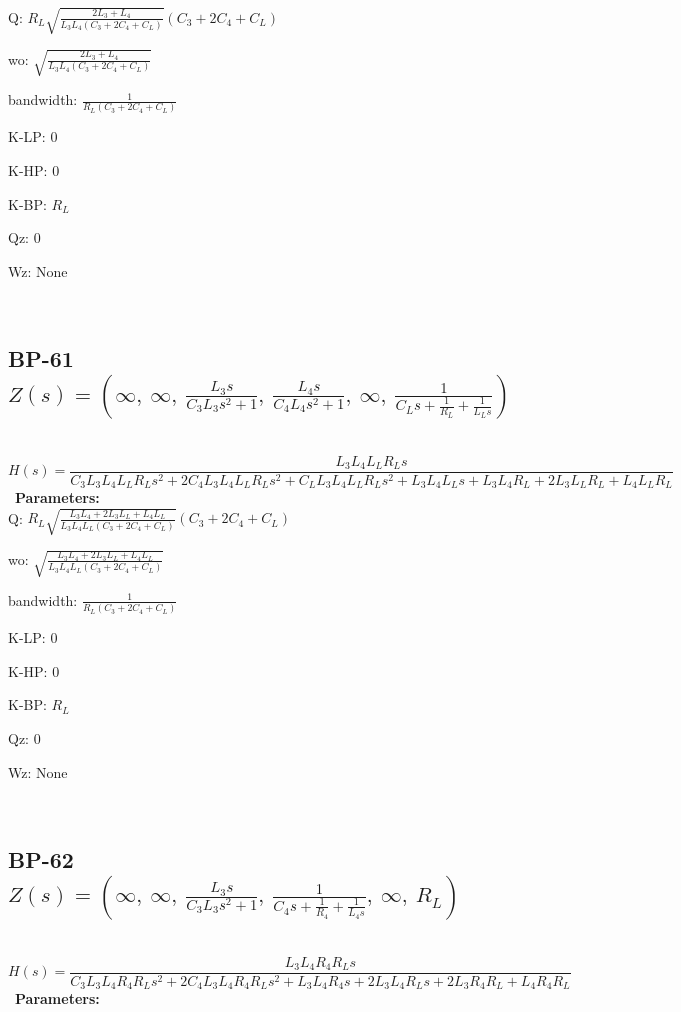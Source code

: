 \documentclass{article}
\begin{document}
Q: $R_{L} \sqrt{\frac{2 L_{3} + L_{4}}{L_{3} L_{4} \left(C_{3} + 2 C_{4} + C_{L}\right)}} \left(C_{3} + 2 C_{4} + C_{L}\right)$\ 

wo: $\sqrt{\frac{2 L_{3} + L_{4}}{L_{3} L_{4} \left(C_{3} + 2 C_{4} + C_{L}\right)}}$\ 

bandwidth: $\frac{1}{R_{L} \left(C_{3} + 2 C_{4} + C_{L}\right)}$\ 

K-LP: $0$\ 

K-HP: $0$\ 

K-BP: $R_{L}$\ 

Qz: $0$\ 

Wz: $\text{None}$\ 

\ 

\subsection{BP-61 $Z(s) = \left( \infty, \  \infty, \  \frac{L_{3} s}{C_{3} L_{3} s^{2} + 1}, \  \frac{L_{4} s}{C_{4} L_{4} s^{2} + 1}, \  \infty, \  \frac{1}{C_{L} s + \frac{1}{R_{L}} + \frac{1}{L_{L} s}}\right)$ } \ 
\textbf{\[H(s) = \frac{L_{3} L_{4} L_{L} R_{L} s}{C_{3} L_{3} L_{4} L_{L} R_{L} s^{2} + 2 C_{4} L_{3} L_{4} L_{L} R_{L} s^{2} + C_{L} L_{3} L_{4} L_{L} R_{L} s^{2} + L_{3} L_{4} L_{L} s + L_{3} L_{4} R_{L} + 2 L_{3} L_{L} R_{L} + L_{4} L_{L} R_{L}}\] } \ 
\textbf{Parameters:}\\ 

Q: $R_{L} \sqrt{\frac{L_{3} L_{4} + 2 L_{3} L_{L} + L_{4} L_{L}}{L_{3} L_{4} L_{L} \left(C_{3} + 2 C_{4} + C_{L}\right)}} \left(C_{3} + 2 C_{4} + C_{L}\right)$\ 

wo: $\sqrt{\frac{L_{3} L_{4} + 2 L_{3} L_{L} + L_{4} L_{L}}{L_{3} L_{4} L_{L} \left(C_{3} + 2 C_{4} + C_{L}\right)}}$\ 

bandwidth: $\frac{1}{R_{L} \left(C_{3} + 2 C_{4} + C_{L}\right)}$\ 

K-LP: $0$\ 

K-HP: $0$\ 

K-BP: $R_{L}$\ 

Qz: $0$\ 

Wz: $\text{None}$\ 

\ 

\subsection{BP-62 $Z(s) = \left( \infty, \  \infty, \  \frac{L_{3} s}{C_{3} L_{3} s^{2} + 1}, \  \frac{1}{C_{4} s + \frac{1}{R_{4}} + \frac{1}{L_{4} s}}, \  \infty, \  R_{L}\right)$ } \ 
\textbf{\[H(s) = \frac{L_{3} L_{4} R_{4} R_{L} s}{C_{3} L_{3} L_{4} R_{4} R_{L} s^{2} + 2 C_{4} L_{3} L_{4} R_{4} R_{L} s^{2} + L_{3} L_{4} R_{4} s + 2 L_{3} L_{4} R_{L} s + 2 L_{3} R_{4} R_{L} + L_{4} R_{4} R_{L}}\] } \ 
\textbf{Parameters:}\\ 
\end{document}
